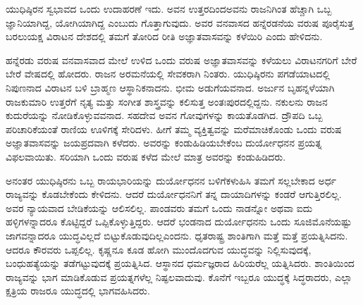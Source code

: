 \vskip 0.1cm

ಯುಧಿಷ್ಠಿರನ ಸ್ವಭಾವದ ಒಂದು ಉದಾಹರಣೆ ಇದು. ಅವನ ಉತ್ತರದಿಂದ\break ಅವನು ರಾಜನಿಗಿಂತ ಹೆಚ್ಚಾಗಿ ಒಬ್ಬ ಜ್ಞಾನಿಯಾಗಿದ್ದ, ಯೋಗಿಯಾಗಿದ್ದ ಎಂಬುದು ಗೊತ್ತಾಗುವುದು. ಅವರ ವನವಾಸದ ಹನ್ನೆರಡನೆಯ ವರುಷ ಪೂರೈಸುತ್ತ ಬರಲು\break ಯಕ್ಷ ವಿರಾಟನ ದೇಶದಲ್ಲಿ ತಮಗೆ ತೋರಿದ ರೀತಿ ಅಜ್ಞಾತವಾಸವನ್ನು ಕಳೆಯಿರಿ ಎಂದು ಹೇಳಿದನು.

\vskip 0.1cm

ಹನ್ನೆರಡು ವರುಷ ವನವಾಸವಾದ ಮೇಲೆ ಉಳಿದ ಒಂದು ವರುಷ ಅಜ್ಞಾತ\-ವಾಸವನ್ನು ಕಳೆಯಲು ವಿರಾಟನಗರಿಗೆ ಬೇರೆ ಬೇರೆ ವೇಷದಲ್ಲಿ ಹೋದರು. ರಾಜನ ಅರಮನೆಯಲ್ಲಿ ಸೇವಕರಾಗಿ ನಿಂತರು. ಯುಧಿಷ್ಠಿರನು ಪಗಡೆಯಾಟದಲ್ಲಿ ನಿಪುಣನಾದ ವಿರಾಟನ ಬಳಿ ಬ್ರಾಹ್ಮಣ ಆಸ್ಥಾನಿಕನಾದನು. ಭೀಮ ಅಡುಗೆಯವನಾದ. ಅರ್ಜುನ ಬೃಹನ್ನಳೆಯಾಗಿ ರಾಜಕುಮಾರಿ ಉತ್ತರೆಗೆ ನೃತ್ಯ ಮತ್ತು ಸಂಗೀತ ಶಾಸ್ತ್ರವನ್ನು ಕಲಿಸುತ್ತ ಅಂತಃಪುರದಲ್ಲಿದ್ದನು. ನಕುಲನು ರಾಜನ ಕುದುರೆಯನ್ನು ನೋಡಿಕೊಳ್ಳುವವನಾದ. ಸಹದೇವ ಅವನ ಗೋವುಗಳನ್ನು ಕಾಯತೊಡಗಿದ. ದ್ರೌಪದಿ ಒಬ್ಬ ಪರಿಚಾರಿಕೆಯಂತೆ ರಾಣಿಯ ಊಳಿಗಕ್ಕೆ ಸೇರಿದಳು. ಹೀಗೆ ತಮ್ಮ ವ್ಯಕ್ತಿತ್ವವನ್ನು ಮರೆಮಾಚಿಕೊಂಡು ಒಂದು ವರುಷ ಅಜ್ಞಾತವಾಸವನ್ನು ಜಯಪ್ರದವಾಗಿ ಕಳೆದರು. ಅವರನ್ನು ಕಂಡುಹಿಡಿಯಬೇಕೆಂಬ ದುರ್ಯೋಧನನ ಪ್ರಯತ್ನ ವಿಫಲವಾಯಿತು. ಸರಿಯಾಗಿ ಒಂದು ವರುಷ ಕಳೆದ ಮೇಲೆ ಮಾತ್ರ ಅವರನ್ನು ಕಂಡು\-ಹಿಡಿದರು.

\vskip 0.1cm

ಅನಂತರ ಯುಧಿಷ್ಠಿರನು ಒಬ್ಬ ರಾಯಭಾರಿಯನ್ನು ದುರ್ಯೋಧನನ ಬಳಿಗೆ\break ಕಳುಹಿಸಿ ತಮಗೆ ಸಲ್ಲಬೇಕಾದ ಅರ್ಧ ರಾಜ್ಯವನ್ನು ಕೊಡಬೇಕೆಂದು ಕೇಳಿದನು. ಆದರೆ ದುರ್ಯೋಧನನಿಗೆ ತನ್ನ ದಾಯಾದಿಗಳನ್ನು ಕಂಡರೆ ಆಗುತ್ತಿರಲಿಲ್ಲ. ಅವರ ನ್ಯಾಯವಾದ ಬೇಡಿಕೆಯನ್ನು ಆಲಿಸಲಿಲ್ಲ. ಪಾಂಡವರು ತಮಗೆ ಒಂದು ನಾಡನ್ನೋ ಅಥವಾ ಐದು ಹಳ್ಳಿಗಳನ್ನಾದರೂ ಕೊಟ್ಟಿದ್ದರೆ ಒಪ್ಪಿಕೊಳ್ಳುತ್ತಿದ್ದರು. ಆದರೆ ಭಂಡನಾದ ದುರ್ಯೋಧನನು ಒಂದು ಸೂಜಿಮೊನೆಯಷ್ಟು ಜಾಗವನ್ನಾದರೂ ಯುದ್ಧವಿಲ್ಲದೆ ಬಿಟ್ಟುಕೊಡುವುದಿಲ್ಲ\break ಎಂದನು. ಧೃತರಾಷ್ಟ್ರ ಶಾಂತಿಗಾಗಿ ಮತ್ತೆ ಮತ್ತೆ ಪ್ರಯತ್ನಿಸಿದನು. ಆದರೂ ಕೌರವರು ಒಪ್ಪಲಿಲ್ಲ. ಕೃಷ್ಣನೂ ಕೂಡ ಹೋಗಿ ಮುಂದೊದಗುವ ಯುದ್ಧವನ್ನು ನಿಲ್ಲಿಸುವುದಕ್ಕೆ, ಬಂಧುಹತ್ಯೆಯನ್ನು ತಡೆಗಟ್ಟುವುದಕ್ಕೆ ಪ್ರಯತ್ನಿಸಿದ. ಆಸ್ಥಾನದ ಧರ್ಮಜ್ಞರಾದ ಹಿರಿಯರೆಲ್ಲ ಯತ್ನಿಸಿದರು. ಶಾಂತಿಯಿಂದ ರಾಜ್ಯವನ್ನು ಭಾಗ ಮಾಡಿಕೊಡುವ ಪ್ರಯತ್ನಗಳೆಲ್ಲ ನಿಷ್ಫಲವಾದುವು. ಕೊನೆಗೆ ಇಬ್ಬರೂ ಯುದ್ಧಕ್ಕೆ ಸಿದ್ಧರಾದರು, ಎಲ್ಲಾ ಕ್ಷತ್ರಿಯ ರಾಜರೂ ಯುದ್ಧದಲ್ಲಿ ಭಾಗವಹಿಸಿದರು.

\vskip 0.1cm

